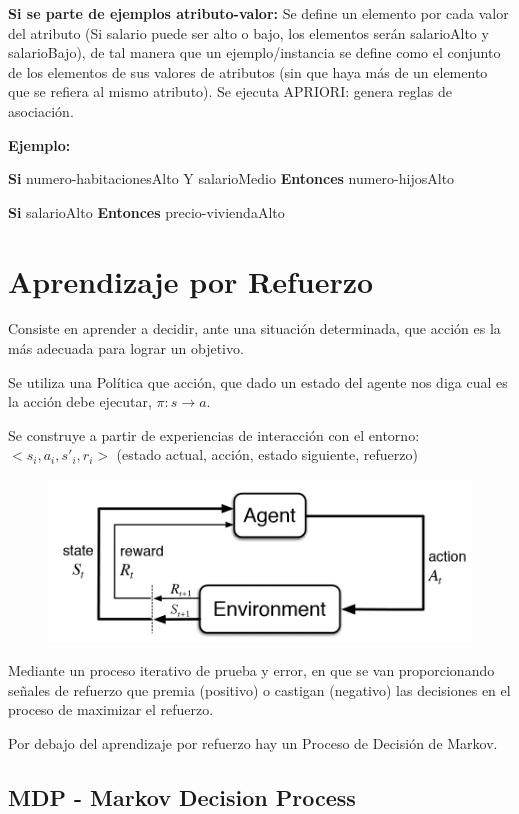 \documentclass[12pt]{report} %
\begin{document}
\textbf{Si se parte de ejemplos atributo-valor:} Se define un elemento por cada valor del atributo (Si salario puede ser alto o bajo, los elementos serán salarioAlto y salarioBajo), de tal manera que un ejemplo/instancia se define como el conjunto de los elementos de sus valores de atributos (sin que haya más de un elemento que se refiera al mismo atributo). Se ejecuta APRIORI: genera reglas de asociación.

\textbf{Ejemplo:}

\textbf{Si} numero-habitacionesAlto Y salarioMedio \textbf{Entonces} numero-hijosAlto

\textbf{Si} salarioAlto \textbf{Entonces} precio-viviendaAlto

\chapter{Aprendizaje por Refuerzo}
Consiste en aprender a decidir, ante una situación determinada, que acción es la más adecuada para lograr un objetivo.

Se utiliza una Política que acción, que dado un estado del agente nos diga cual es la acción debe ejecutar, $\pi: s \rightarrow a$. 

Se construye a partir de experiencias de interacción con el entorno: $<s_i, a_i, s'_i, r_i>$ (estado actual, acción, estado siguiente, refuerzo)
\begin{figure}[H]
  {\includegraphics[scale=.3]{default.jpg}}
\end{figure}

Mediante un proceso iterativo de prueba y error, en que se van proporcionando señales de refuerzo que premia (positivo) o castigan (negativo) las decisiones en el proceso de maximizar el refuerzo.

Por debajo del aprendizaje por refuerzo hay un Proceso de Decisión de Markov.

\section{MDP - Markov Decision Process}
\end{document}
